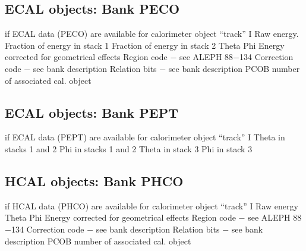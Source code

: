 \subsection{\label{sec-TVAPECO}ECAL objects: Bank PECO}
\par
\begin{indentlist}{ 3.00cm}{ 3.25cm}
 if ECAL data (PECO) are available
for calorimeter object ``track'' I
Raw energy.
Fraction of energy in stack 1
Fraction of energy in stack 2
Theta
Phi
Energy corrected for geometrical effects
Region code $-$ see ALEPH 88$-$134
Correction code $-$ see bank description
Relation bits $-$ see bank description
PCOB number of associated cal. object
\end{indentlist}
\subsection{\label{sec-TVAPEPT}ECAL objects: Bank PEPT}
\par
\begin{indentlist}{ 3.00cm}{ 3.25cm}
 if ECAL data (PEPT) are available
for calorimeter object ``track'' I
Theta in stacks 1 and 2
Phi in stacks 1 and 2
Theta in stack 3
Phi in stack 3
\end{indentlist}
\subsection{\label{sec-TVAPHCO}HCAL objects: Bank PHCO}
\par
\begin{indentlist}{ 3.00cm}{ 3.25cm}
 if HCAL data (PHCO) are available
for calorimeter object ``track'' I
Raw energy
Theta
Phi
Energy corrected for geometrical effects
Region code $-$ see ALEPH 88$-$134
Correction code $-$ see bank description
Relation bits $-$ see bank description
PCOB number of associated cal. object
\end{indentlist}
